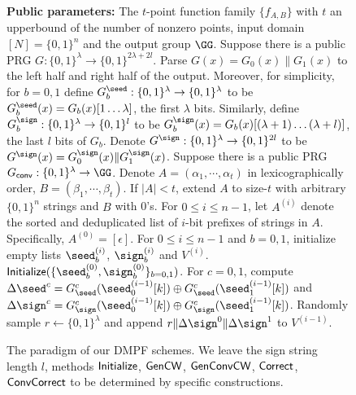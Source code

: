 \begin{figure*}
    \caption{The paradigm of our DMPF schemes. We leave the sign string length $l$, methods $\sf Initialize$, $\sf GenCW$, $\sf GenConvCW$, $\sf Correct$, $\sf ConvCorrect$ to be determined by specific constructions. }
    \label{fig:DMPF_paradigm}
    \begin{breakablealgorithm}
    \begin{algorithmic}[1]
      \State \textbf{Public parameters: }
      \State The $t$-point function family $\{f_{A,B}\}$ with $t$ an upperbound of the number of nonzero points, input domain $[N]=\{0,1\}^n$ and the output group $\GG$. 
      \State Suppose there is a public PRG $G:\{0,1\}^\lambda\rightarrow \{0,1\}^{2\lambda+2l}$. Parse $G(x) = G_0(x)\|G_1(x)$ to the left half and right half of the output. Moreover, for simplicity, for $b = 0,1$ define $G_b^\seed:\{0,1\}^\lambda\rightarrow \{0,1\}^{\lambda}$ to be $G_b^\seed(x) = G_b(x)[1\dots\lambda]$, the first $\lambda$ bits. Similarly, define $G_b^\sign:\{0,1\}^\lambda\rightarrow \{0,1\}^{l}$ to be $G_b^\sign(x) = G_b(x)[(\lambda+1)\dots(\lambda+l)]$, the last $l$ bits of $G_b$. Denote $G^\sign:\{0,1\}^\lambda\rightarrow \{0,1\}^{2l}$ to be $G^\sign(x) = G_0^\sign(x)\|G_1^\sign(x)$. 
      \State Suppose there is a public PRG $G_{\sf conv}:\{0,1\}^\lambda\rightarrow \GG$. 
      \State Denote $A = (\alpha_1,\cdots,\alpha_t)$ in lexicographically order, $B = (\beta_1,\cdots,\beta_t)$. If $|A|<t$, extend $A$ to size-$t$ with arbitrary $\{0,1\}^n$ strings and $B$ with 0's. 
      \State For $0\le i\le n-1$, let $A^{(i)}$ denote the sorted and deduplicated list of $i$-bit prefixes of strings in $A$. Specifically, $A^{(0)} = [\epsilon]$. 
      \State For $0\le i\le n-1$ and $b=0,1$, initialize empty lists $\seed_b^{(i)}$, $\sign_b^{(i)}$ and $V^{(i)}$. 
      \State ${\sf Initialize}(\{\seed_b^{(0)},\sign_b^{(0)}\}_{b=0,1})$. 
        \State For $c=0,1$, compute $\Delta\seed^c = G_\seed^c(\seed_0^{(i-1)}[k])\oplus G_\seed^c(\seed_1^{(i-1)}[k])$ and $\Delta\sign^c = G_\sign^c(\seed_0^{(i-1)}[k])\oplus G_\sign^c(\seed_1^{(i-1)}[k])$. 
            \State Randomly sample $r\gets \{0,1\}^\lambda$ and append $r\|\Delta\sign^0\|\Delta\sign^1$ to $V^{(i-1)}$. 

\end{algorithmic}
\end{breakablealgorithm}
\end{figure*}
